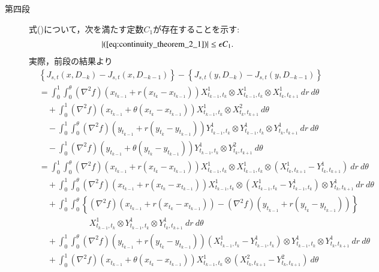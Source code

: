 \begin{prf}
\begin{description}
			\item[第四段]
				式()について，次を満たす定数$C_1$が存在することを示す:
				\begin{align}
					|(\refeq{eq:continuity_theorem_2_1})| \leq \epsilon C_1.
					\label{eq:continuity_theorem_2_3}
				\end{align}
				実際，前段の結果より
				\begin{align}
					&\left\{ J_{s,t}(x,D_{-k}) - J_{s,t}(x,D_{-k-1}) \right\} - 
						\left\{ J_{s,t}(y,D_{-k}) - J_{s,t}(y,D_{-k-1}) \right\} \\
					&=	\int_0^1 \int_0^\theta (\nabla^2 f)(x_{t_{k-1}}+r(x_{t_k}-x_{t_{k-1}})) X^1_{t_{k-1},t_k} \otimes X^1_{t_{k-1},t_k} \otimes X^1_{t_k,t_{k+1}}\ dr\ d\theta \\
						&\quad + \int_0^1 (\nabla^2 f)(x_{t_{k-1}}+\theta(x_{t_k}-x_{t_{k-1}}))X^1_{t_{k-1},t_k} \otimes X^2_{t_k,t_{k+1}}\ d\theta \\
						&\quad - \int_0^1 \int_0^\theta (\nabla^2 f)(y_{t_{k-1}}+r(y_{t_k}-y_{t_{k-1}})) Y^1_{t_{k-1},t_k} \otimes Y^1_{t_{k-1},t_k} \otimes Y^1_{t_k,t_{k+1}}\ dr\ d\theta \\
						&\quad - \int_0^1 (\nabla^2 f)(y_{t_{k-1}}+\theta(y_{t_k}-y_{t_{k-1}}))Y^1_{t_{k-1},t_k} \otimes Y^2_{t_k,t_{k+1}}\ d\theta \\
					&= \int_0^1 \int_0^\theta (\nabla^2 f)(x_{t_{k-1}}+r(x_{t_k}-x_{t_{k-1}})) X^1_{t_{k-1},t_k} \otimes X^1_{t_{k-1},t_k} \otimes \left(X^1_{t_k,t_{k+1}} - Y^1_{t_k,t_{k+1}}\right)\ dr\ d\theta \\
						&\quad + \int_0^1 \int_0^\theta (\nabla^2 f)(x_{t_{k-1}}+r(x_{t_k}-x_{t_{k-1}})) X^1_{t_{k-1},t_k} \otimes \left(X^1_{t_{k-1},t_k} - Y^1_{t_{k-1},t_k} \right) \otimes Y^1_{t_k,t_{k+1}}\ dr\ d\theta \\
						&\quad +  \int_0^1 \int_0^\theta \left\{ (\nabla^2 f)(x_{t_{k-1}}+r(x_{t_k}-x_{t_{k-1}})) - (\nabla^2 f)(y_{t_{k-1}}+r(y_{t_k}-y_{t_{k-1}})) \right\} \\
						&\qquad\qquad\qquad X^1_{t_{k-1},t_k} \otimes Y^1_{t_{k-1},t_k} \otimes Y^1_{t_k,t_{k+1}}\ dr\ d\theta \\
						&\quad + \int_0^1 \int_0^\theta (\nabla^2 f)(y_{t_{k-1}}+r(y_{t_k}-y_{t_{k-1}})) \left( X^1_{t_{k-1},t_k} - Y^1_{t_{k-1},t_k} \right) \otimes Y^1_{t_{k-1},t_k} \otimes Y^1_{t_k,t_{k+1}}\ dr\ d\theta \\
						&\quad + \int_0^1 (\nabla^2 f)(x_{t_{k-1}}+\theta(x_{t_k}-x_{t_{k-1}}))X^1_{t_{k-1},t_k} \otimes \left(X^2_{t_k,t_{k+1}} -  Y^2_{t_k,t_{k+1}}\right)\ d\theta \\

\end{align}
\end{description}
\end{prf}

